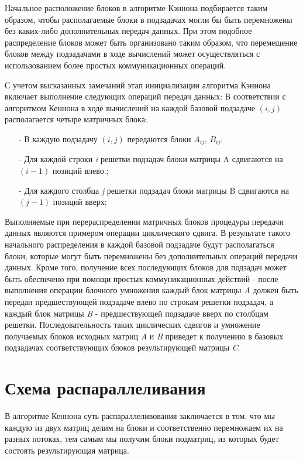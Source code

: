 \documentclass{report}
\begin{document}
\par Начальное расположение блоков в алгоритме Кэннона подбирается таким образом, чтобы располагаемые блоки в подзадачах могли бы быть перемножены без каких-либо дополнительных передач данных. При этом подобное распределение блоков может быть организовано таким образом, что перемещение блоков между подзадачами в ходе вычислений может осуществляться с использованием более простых коммуникационных операций.
\par   С учетом высказанных замечаний этап инициализации алгоритма Кэннона включает выполнение следующих операций передач данных:
В соответствии с алгоритмом Кеннона в ходе вычислений на каждой базовой подзадаче {\itshape $(i,j)$} располагается четыре матричных блока:
\begin{itemize}
    \item[-] В каждую подзадачу {\itshape $(i,j)$} передаются блоки {\itshape $A_{ij}$}, {\itshape $B_{ij}$};
    \item[-] Для каждой строки {\itshape i} решетки подзадач блоки матрицы A сдвигаются на {\itshape $(i-1)$} позиций влево.;
    \item[-] Для каждого столбца {\itshape j} решетки подзадач блоки матрицы B сдвигаются на {\itshape $(j-1)$} позиций вверх;
\end{itemize}
\par Выполняемые при перераспределении матричных блоков процедуры передачи данных являются примером операции циклического сдвига. В результате такого начального распределения в каждой базовой подзадаче будут располагаться блоки, которые могут быть перемножены без дополнительных операций передачи данных. Кроме того, получение всех последующих блоков для подзадач может быть обеспечено при помощи простых коммуникационных действий - после выполнения операции блочного умножения каждый блок матрицы {\itshape A} должен быть передан предшествующей подзадаче влево по строкам решетки подзадач, а каждый блок матрицы {\itshape B} - предшествующей подзадаче вверх по столбцам решетки. Последовательность таких циклических сдвигов и умножение получаемых блоков исходных матриц {\itshape A} и {\itshape B} приведет к получению в базовых подзадачах соответствующих блоков результирующей матрицы {\itshape C}.
\newpage

\section*{Схема распараллеливания}
В алгоритме Кеннона суть распараллеливования заключается в том, что мы каждую из двух матриц делим на блоки и соответственно перемножаем их на разных потоках, тем самым мы получим блоки подматриц, из которых будет состоять результирующая матрица.
\newpage
\end{document}
